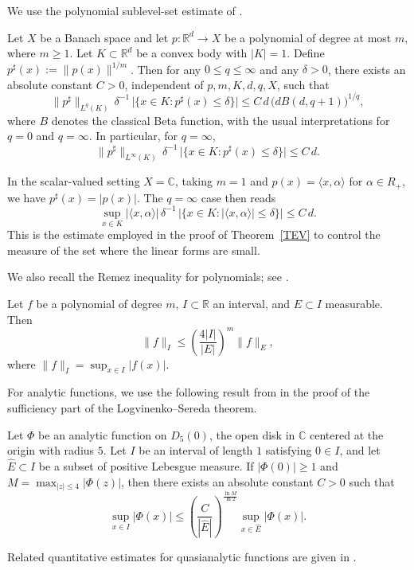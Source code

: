 \documentclass[12pt]{article}
\begin{document}
We use the polynomial sublevel-set estimate of \cite{ACJ}.

\begin{lemma}
\label{lem:carbery-wright}
Let $X$ be a Banach space and let $p:\mathbb{R}^d \to X$ be a polynomial of degree at most $m$, where $m\ge1$. Let $K \subset \mathbb{R}^d$ be a convex body with $|K|=1$. Define $p^\sharp(x) := \|p(x)\|^{1/m}$. Then for any $0 \le q \le \infty$ and any $\delta > 0$, there exists an absolute constant $C>0$, independent of $p,m,K,d,q,X$, such that
\[
\|p^\sharp\|_{L^q(K)} \, \delta^{-1} \, \bigl|\{ x \in K : p^\sharp(x) \le \delta \}\bigr|
\le C\, d\, \bigl(d B(d,q+1)\bigr)^{1/q},
\]
where $B$ denotes the classical Beta function, with the usual interpretations for $q=0$ and $q=\infty$. In particular, for $q=\infty$,
\[
\|p^\sharp\|_{L^\infty(K)} \, \delta^{-1} \, \bigl|\{ x \in K : p^\sharp(x) \le \delta \}\bigr| \le C\, d.
\]
\end{lemma}

\begin{remark}\label{R29}
In the scalar-valued setting $X=\mathbb{C}$, taking $m=1$ and $p(x)=\langle x,\alpha\rangle$ for $\alpha\in R_+$, we have $p^\sharp(x)=|p(x)|$. The $q=\infty$ case then reads
\[
\sup_{x\in K} |\langle x,\alpha\rangle| \, \delta^{-1} \, \bigl|\{ x \in K : |\langle x,\alpha\rangle| \le \delta \}\bigr| \le C\, d.
\]
This is the estimate employed in the proof of Theorem~\ref{TEV} to control the measure of the set where the linear forms are small.
\end{remark}

We also recall the Remez inequality for polynomials; see \cite{EJR}.

Let $f$ be a polynomial of degree $m$, $I\subset\mathbb {R}$ an interval, and $E\subset I$ measurable. Then
\begin{equation}
\|f\|_I \le \left(\frac{4|I|}{|E|}\right)^m\|f\|_E,
\end{equation}
where $\|f\|_I=\sup_{x\in I} |f(x)|$.

 For analytic functions, we use the following result from \cite[Lemma~1]{OK} in the proof of the sufficiency part of the Logvinenko--Sereda theorem.

\begin{lemma}\label{L1}
Let $\Phi$ be an analytic function on $D_5(0)$, the open disk in $\mathbb{C}$ centered at the origin with radius $5$. Let $I$ be an interval of length $1$ satisfying $0 \in I$, and let $\hat{E} \subset I$ be a subset of positive Lebesgue measure. If $|\Phi(0)| \geq 1$ and $M = \max_{|z|\leq 4} |\Phi(z)|$, then there exists an absolute constant $C > 0$ such that
\begin{equation}
\sup_{x\in I} |\Phi(x)| \leq \left(\frac{C}{|\hat{E}|}\right)^{\frac{\ln M}{\ln 2}} \sup_{x\in \hat{E}} |\Phi(x)|.
\end{equation}
\end{lemma}
 Related quantitative estimates for quasianalytic functions are given in \cite{FNM}.
\end{document}
